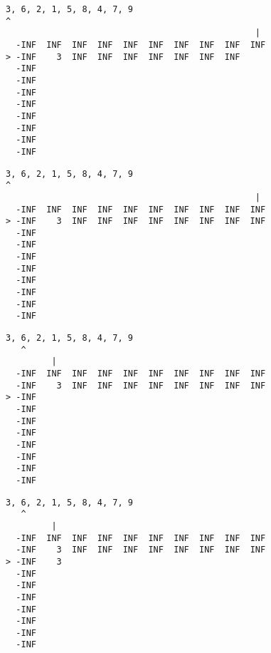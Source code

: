 { \begin{verbatim}
3, 6, 2, 1, 5, 8, 4, 7, 9
^
                                                 |
  -INF  INF  INF  INF  INF  INF  INF  INF  INF  INF
> -INF    3  INF  INF  INF  INF  INF  INF  INF     
  -INF                                             
  -INF                                             
  -INF                                             
  -INF                                             
  -INF                                             
  -INF                                             
  -INF                                             
  -INF                                             
\end{verbatim} }

{ \begin{verbatim}
3, 6, 2, 1, 5, 8, 4, 7, 9
^
                                                 |
  -INF  INF  INF  INF  INF  INF  INF  INF  INF  INF
> -INF    3  INF  INF  INF  INF  INF  INF  INF  INF
  -INF                                             
  -INF                                             
  -INF                                             
  -INF                                             
  -INF                                             
  -INF                                             
  -INF                                             
  -INF                                             
\end{verbatim} }

{ \begin{verbatim}
3, 6, 2, 1, 5, 8, 4, 7, 9
   ^
         |
  -INF  INF  INF  INF  INF  INF  INF  INF  INF  INF
  -INF    3  INF  INF  INF  INF  INF  INF  INF  INF
> -INF                                             
  -INF                                             
  -INF                                             
  -INF                                             
  -INF                                             
  -INF                                             
  -INF                                             
  -INF                                             
\end{verbatim} }

{ \begin{verbatim}
3, 6, 2, 1, 5, 8, 4, 7, 9
   ^
         |
  -INF  INF  INF  INF  INF  INF  INF  INF  INF  INF
  -INF    3  INF  INF  INF  INF  INF  INF  INF  INF
> -INF    3                                        
  -INF                                             
  -INF                                             
  -INF                                             
  -INF                                             
  -INF                                             
  -INF                                             
  -INF                                             
\end{verbatim} }

